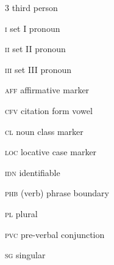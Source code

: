 \documentclass[output=paper]{langsci/langscibook}
\begin{document}
{{{{{{{\begin{styleTabellenInhalt}
3  third person
\end{styleTabellenInhalt}

\begin{styleTabellenInhalt}
\textsc{i  }set I pronoun
\end{styleTabellenInhalt}

\begin{styleTabellenInhalt}
\textsc{ii  }set II pronoun
\end{styleTabellenInhalt}

\begin{styleTabellenInhalt}
\textsc{iii  }set III pronoun
\end{styleTabellenInhalt}

\begin{styleTabellenInhalt}
\textsc{aff}  affirmative marker
\end{styleTabellenInhalt}

\begin{styleTabellenInhalt}
\textsc{cfv}  citation form vowel
\end{styleTabellenInhalt}

\begin{styleTabellenInhalt}
\textsc{cl  }noun class marker
\end{styleTabellenInhalt}

\begin{styleTabellenInhalt}
\textsc{loc  }locative case marker
\end{styleTabellenInhalt}

\begin{styleTabellenInhalt}
\textsc{idn  }identifiable
\end{styleTabellenInhalt}

\begin{styleTabellenInhalt}
\textsc{phb  }(verb) phrase boundary
\end{styleTabellenInhalt}

\begin{styleTabellenInhalt}
\textsc{pl  }plural
\end{styleTabellenInhalt}

\begin{styleTabellenInhalt}
\textsc{pvc  }pre-verbal conjunction
\end{styleTabellenInhalt}

\begin{styleTabellenInhalt}
\textsc{sg  }singular
\end{styleTabellenInhalt}

}}}}}}}
\end{document}
